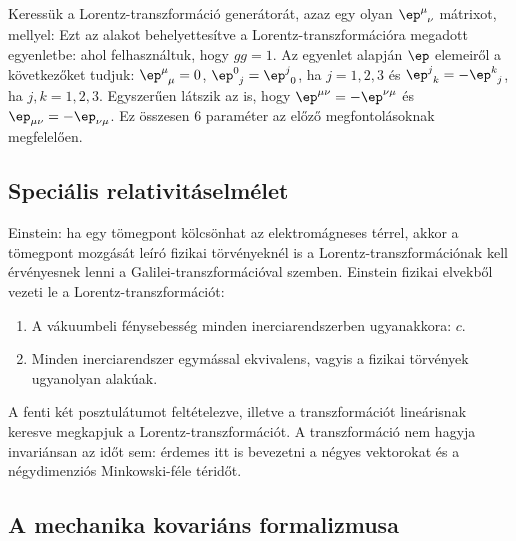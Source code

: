     Keressük a Lorentz-transzformáció generátorát, azaz egy olyan $\ep^\mu_{\phantom{\mu}\nu}$ mátrixot, mellyel:
    Ezt az alakot behelyettesítve a Lorentz-transzformációra megadott egyenletbe:
    ahol felhasználtuk, hogy $gg=1$.
   Az egyenlet alapján $\ep$ elemeiről a következőket tudjuk: $\ep^\mu_{\phantom{\mu}\mu}=0$, $\ep^0_{\phantom{0}j}=\ep^j_{\phantom{j}0}$, ha $j=1,2,3$ és $\ep^j_{\phantom{j}k}=-\ep^k_{\phantom{k}j}$, ha $j,k=1,2,3$.
   Egyszerűen látszik az is, hogy $\ep^{\mu\nu}=-\ep^{\nu\mu}$ és $\ep_{\mu\nu}=-\ep_{\nu\mu}$.
   Ez összesen 6 paraméter az előző megfontolásoknak megfelelően.

  \subsection{Speciális relativitáselmélet}
   
   Einstein: ha egy tömegpont kölcsönhat az elektromágneses térrel, akkor a tömegpont mozgását leíró fizikai törvényeknél is a Lorentz-transzformációnak kell érvényesnek lenni a Galilei-transzformációval szemben.
   Einstein fizikai elvekből vezeti le a Lorentz-transzformációt:
   \begin{enumerate}
    \item A vákuumbeli fénysebesség minden inerciarendszerben ugyanakkora: $c$.
    \item Minden inerciarendszer egymással ekvivalens, vagyis a fizikai törvények ugyanolyan alakúak.
   \end{enumerate}
   
   A fenti két posztulátumot feltételezve, illetve a transzformációt lineárisnak keresve megkapjuk a Lorentz-transzformációt.
   A transzformáció nem hagyja invariánsan az időt sem: érdemes itt is bevezetni a négyes vektorokat és a négydimenziós Minkowski-féle téridőt.
   
  \subsection{A mechanika kovariáns formalizmusa}
   
